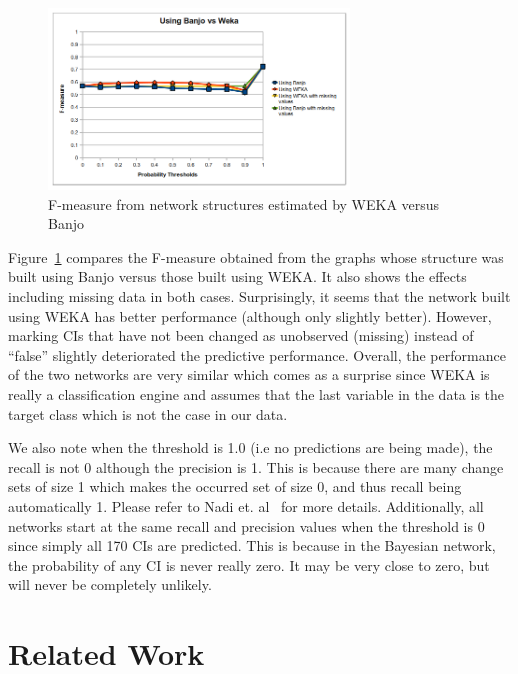 \documentclass[10pt,twocolumn,letterpaper]{article}
\begin{document}
\begin{figure}[!t]
\centering
\includegraphics[width=8cm]{graphics/banjowekares.png}
\caption{F-measure from network structures estimated by WEKA versus Banjo}
\label{fig:wekabnj}
\end{figure}

Figure~\ref{fig:wekabnj} compares the F-measure obtained from the graphs whose structure was built using Banjo versus those built using WEKA. It also shows the
effects including missing data in both cases. Surprisingly, it seems that the network built using WEKA has better performance (although only slightly better).
However, marking CIs that have not been changed as unobserved (missing) instead of ``false'' slightly deteriorated the predictive performance. Overall, the
performance of the two networks are very similar which comes as a surprise since WEKA is really a classification engine and assumes that the last variable in
the data is the target class which is not the case in our data. 

We also note when the threshold is 1.0 (i.e no predictions are being made), the recall is not 0 although the precision is 1. This is because there are many
change sets of size 1 which makes the occurred set of size 0, and thus recall being automatically 1. Please refer to Nadi et. al~\cite{nadi2010} for more
details. Additionally, all networks start at the same recall and precision values when the threshold is 0 since simply all 170 CIs are predicted. This is
because in the Bayesian network, the probability of any CI is never really zero. It may be very close to zero, but will never be completely unlikely.



\section{Related Work}
\label{rel-work}
\end{document}

